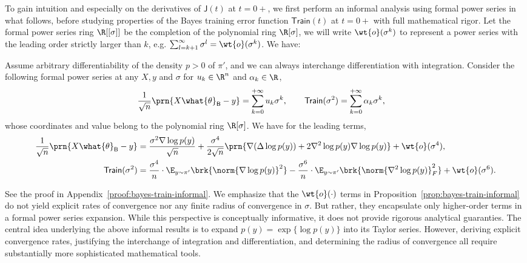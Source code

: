 \documentclass[11pt]{article}
\newcommand{\bysest}{\what{\theta}_{\mathsf{B}}}
\newcommand{\trerr}{\mathsf{Train}}
\newcommand{\tfunc}{\mathsf{Train}}
\newcommand{\jfunc}{\mathsf{J}}
\begin{document}
To gain intuition and especially on the derivatives of $\jfunc(t)$ at $t=0+$, we first perform an informal analysis using formal power series in what follows, before studying properties of the Bayes training error function $\tfunc(t)$ at $t=0+$ with full mathematical rigor. Let the formal power series ring $\R[[\sigma]]$ be the completion of the polynomial ring $\R[\sigma]$, we will write $\wt{o}(\sigma^k)$ to represent a power series with the leading order strictly larger than $k$, e.g. $\sum_{l=k+1}^\infty \sigma^l = \wt{o}(\sigma^k)$. We have:
\begin{proposition} \label{prop:bayes-train-informal}
Assume arbitrary differentiability of the density $p > 0$ of $\pi'$, and we can always interchange differentiation with integration. Consider the following formal power series at any $X,y$ and $\sigma$ for $u_k \in \R^n$ and $\alpha_k \in \R$,
\begin{align*}
    \frac{1}{\sqrt{n}} \prn{X\bysest - y} & = \sum_{k=0}^{+\infty} u_k \sigma^k, \qquad \trerr(\sigma^2) = \sum_{k=0}^{+\infty} \alpha_k \sigma^{k},
\end{align*}
whose coordinates and value belong to the polynomial ring $\R[\sigma]$. We have for the leading terms,
\begin{align*}
    \frac{1}{\sqrt{n}} \prn{X\bysest - y} & = \frac{\sigma^2 \nabla \log p(y)}{\sqrt{n}} + \frac{\sigma^4}{2\sqrt{n}} \prn{\nabla (\Delta \log p(y)) + 2\nabla^2 \log p(y) \nabla \log p(y) } + \wt{o}(\sigma^4), \\
    \trerr(\sigma^2) & = \frac{\sigma^4}{n} \cdot \E_{y \sim \pi'} \brk{\norm{ \nabla \log p(y) }^2} -\frac{\sigma^6}{n} \cdot \E_{y \sim \pi'} \brk{\norm{ \nabla^2 \log p(y) }_F^2} + \wt{o}(\sigma^6).
\end{align*}
\end{proposition}
See the proof in Appendix~\ref{proof:bayes-train-informal}. We emphasize that the $\wt{o}(\cdot)$ terms in Proposition~\ref{prop:bayes-train-informal} do not yield explicit rates of convergence nor any finite radius of convergence in $\sigma$. But rather, they encapsulate only higher-order terms in a formal power series expansion. While this perspective is conceptually informative, it does not provide rigorous analytical guaranties. The central idea underlying the above informal results is to expand $p(y) = \exp\{\log p(y)\}$ into its Taylor series. However, deriving explicit convergence rates, justifying the interchange of integration and differentiation, and determining the radius of convergence all require substantially more sophisticated mathematical tools.
\end{document}
